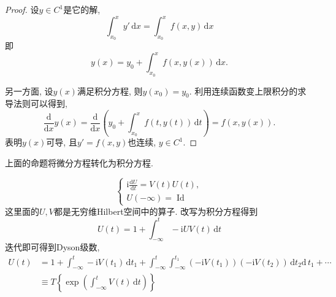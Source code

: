 \begin{proof}
  设$y \in C^{1}$是它的解, 
  \begin{equation}
    \int _{x_0}^{x} y'\, \mathrm{d} x = \int _{x_0}^{x} f(x,y) \, \mathrm{d} x
  \end{equation}
  即
  \begin{equation}
    y(x) = y_0 + \int_{x_0}^{x} f(x,y(x)) \, \mathrm{d}x .
  \end{equation}


  另一方面, 设$y(x)$满足积分方程, 则$y(x_0) = y_0$.
  利用连续函数变上限积分的求导法则可以得到,
  \begin{equation}
    \frac{\mathrm{d}}{\mathrm{d} x} y(x) = \frac{\mathrm{d} }{\mathrm{d} x} \left( y_0 + \int_{x_0}^{x} f(t,y(t)) \, \mathrm{d}t  \right) = f(x,y(x)).
  \end{equation}
  表明$y(x)$可导, 且$y' = f(x,y)$也连续, $y \in C^{1}$.
\end{proof}
上面的命题将微分方程转化为积分方程.
\begin{example}[含时微扰论]
  \begin{equation}
    \begin{cases}
      \mathrm{i} \frac{\mathrm{d} U}{\mathrm{d} t} = V(t) U(t), \\
      U(-\infty ) = \operatorname{Id}
    \end{cases}
  \end{equation}
  这里面的$U,V$都是无穷维Hilbert空间中的算子. 改写为积分方程得到
  \begin{equation}
    U(t) = 1 + \int_{-\infty }^{t} -\mathrm{i} U V(t) \, \mathrm{d}t 
  \end{equation}
  迭代即可得到Dyson级数,
  \begin{equation}
    \begin{aligned}
      U(t) & = 1 + \int_{-\infty}^{t} -\mathrm{i} V(t_1) \, \mathrm{d}t_1 + \int _{-\infty }^{t}\int _{-\infty }^{t_1} \left( -\mathrm{i}V(t_1) \right) \left( -\mathrm{i}V(t_2) \right)\, \mathrm{d} t_2 \mathrm{d} \,t_1 +\cdots  \\
           & \equiv  T\left\{ \exp \left( \int _{-\infty }^{t} V(t) \, \mathrm{d} t \right) \right\}
    \end{aligned}
  \end{equation}
\end{example}

